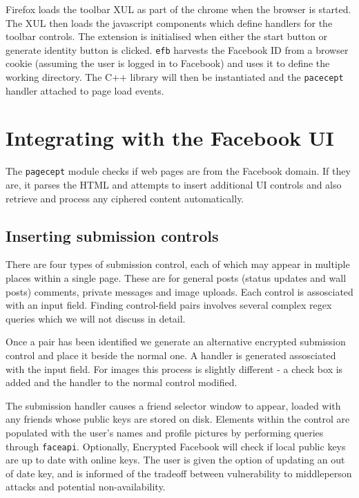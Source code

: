 Firefox loads the toolbar XUL as part of the chrome when the browser is started. The XUL then loads the javascript components which define handlers for the toolbar controls. The extension is initialised when either the start button or generate identity button is clicked. {\tt efb} harvests the Facebook ID from a browser cookie (assuming the user is logged in to Facebook) and uses it to define the working directory. The C++ library will then be instantiated and the {\tt pacecept} handler attached to page load events.


\FloatBarrier
\section{Integrating with the Facebook UI}

The {\tt pagecept} module checks if web pages are from the Facebook domain. If they are, it parses the HTML and attempts to insert additional UI controls and also retrieve and process any ciphered content automatically. 


\subsection{Inserting submission controls}

There are four types of submission control, each of which may appear in multiple places within a single page. These are for general posts (status updates and wall posts) comments, private messages and image uploads. Each control is assosciated with an input field. Finding control-field pairs involves several complex regex queries which we will not discuss in detail.

Once a pair has been identified we generate an alternative encrypted submission control and place it beside the normal one. A handler is generated assosciated with the input field. For images this process is slightly different - a check box is added and the handler to the normal control modified.

The submission handler causes a friend selector window to appear, loaded with any friends whose public keys are stored on disk. Elements within the control are populated with the user's names and profile pictures by performing queries through {\tt faceapi}. Optionally, Encrypted Facebook will check if local public keys are up to date with online keys. The user is given the option of updating an out of date key, and is informed of the tradeoff between vulnerability to middleperson attacks and potential non-availability.


